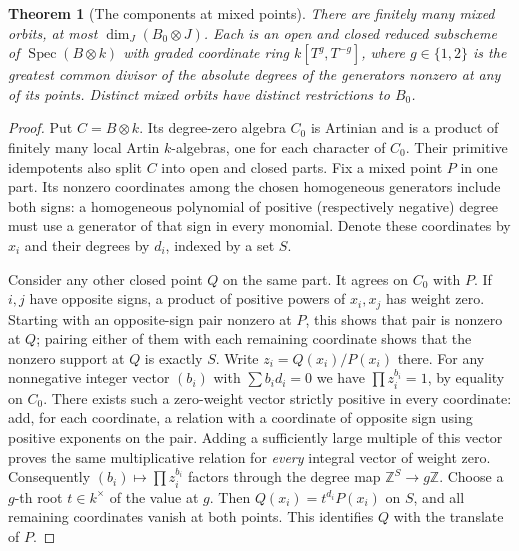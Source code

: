 \documentclass[a4paper,11pt]{article}
\newtheorem{theorem}[proposition]{Theorem}
\theoremstyle{definition}
\theoremstyle{remark}
\newcommand{\ZZ}{\mathbb Z}\newcommand{\ord}{\operatorname{ord}}
\numberwithin{equation}{section}
\begin{document}
\begin{theorem}[The components at mixed points]\leavevmode\label{thm:orbits34}
There are finitely many mixed orbits, at most \(\dim_J(B_0\otimes J)\). Each is an open and closed reduced subscheme of \(\operatorname{Spec}(B\otimes k)\) with graded coordinate ring \(k[T^g,T^{-g}]\), where \(g\in\{1,2\}\) is the greatest common divisor of the absolute degrees of the generators nonzero at any of its points. Distinct mixed orbits have distinct restrictions to \(B_0\).
\end{theorem}
\begin{proof}
Put \(C=B\otimes k\). Its degree-zero algebra \(C_0\) is Artinian and is a product of finitely many local Artin \(k\)-algebras, one for each character of \(C_0\). Their primitive idempotents also split \(C\) into open and closed parts. Fix a mixed point \(P\) in one part. Its nonzero coordinates among the chosen homogeneous generators include both signs: a homogeneous polynomial of positive (respectively negative) degree must use a generator of that sign in every monomial. Denote these coordinates by \(x_i\) and their degrees by \(d_i\), indexed by a set \(S\).

Consider any other closed point \(Q\) on the same part. It agrees on \(C_0\) with \(P\). If \(i,j\) have opposite signs, a product of positive powers of \(x_i,x_j\) has weight zero. Starting with an opposite-sign pair nonzero at \(P\), this shows that pair is nonzero at \(Q\); pairing either of them with each remaining coordinate shows that the nonzero support at \(Q\) is exactly \(S\). Write \(z_i=Q(x_i)/P(x_i)\) there. For any nonnegative integer vector \((b_i)\) with \(\sum b_i d_i=0\) we have \(\prod z_i^{b_i}=1\), by equality on \(C_0\). There exists such a zero-weight vector strictly positive in every coordinate: add, for each coordinate, a relation with a coordinate of opposite sign using positive exponents on the pair. Adding a sufficiently large multiple of this vector proves the same multiplicative relation for \emph{every} integral vector of weight zero. Consequently \((b_i)\mapsto\prod z_i^{b_i}\) factors through the degree map \(\ZZ^S\to g\ZZ\). Choose a \(g\)-th root \(t\in k^\times\) of the value at \(g\). Then \(Q(x_i)=t^{d_i}P(x_i)\) on \(S\), and all remaining coordinates vanish at both points. This identifies \(Q\) with the translate of \(P\).


\end{proof}
\end{document}
